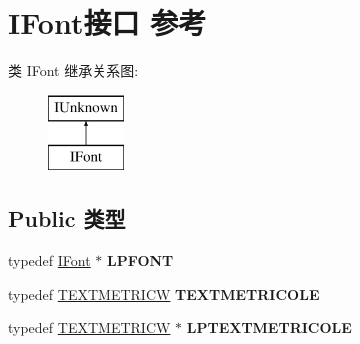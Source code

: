 \hypertarget{interface_i_font}{}\section{I\+Font接口 参考}
\label{interface_i_font}
类 I\+Font 继承关系图\+:\begin{figure}[H]
\begin{center}
\leavevmode
\includegraphics[height=2.000000cm]{interface_i_font}
\end{center}
\end{figure}
\subsection*{Public 类型}
\begin{DoxyCompactItemize}
\item 
\mbox{\label{interface_i_font_a06f8a8d61595e681e5d935bba0afcec5}} 
typedef \hyperlink{interface_i_font}{I\+Font} $\ast$ {\bfseries L\+P\+F\+O\+NT}
\item 
\mbox{\label{interface_i_font_a0221d6008bee2017cb905ec2c2af5fa5}} 
typedef \hyperlink{structtag_t_e_x_t_m_e_t_r_i_c_w}{T\+E\+X\+T\+M\+E\+T\+R\+I\+CW} {\bfseries T\+E\+X\+T\+M\+E\+T\+R\+I\+C\+O\+LE}
\item 
\mbox{\label{interface_i_font_a3cf38a5078b08de6a943b9bb9dee5a60}} 
typedef \hyperlink{structtag_t_e_x_t_m_e_t_r_i_c_w}{T\+E\+X\+T\+M\+E\+T\+R\+I\+CW} $\ast$ {\bfseries L\+P\+T\+E\+X\+T\+M\+E\+T\+R\+I\+C\+O\+LE}
\end{DoxyCompactItemize}

